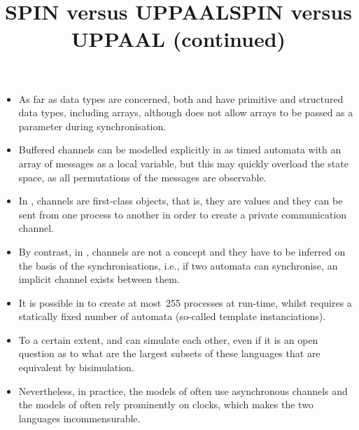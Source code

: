 \documentclass[wide]{slides}
\begin{document}
\begin{slide}
  \title{SPIN versus UPPAAL}

  \begin{itemize}

    \item As far as data types are concerned, both \Promela and
      \UPPAAL have primitive and structured data types, including
      arrays, although \Promela does not allow arrays to be passed as
      a parameter during synchronisation.

    \item Buffered channels can be modelled explicitly in \UPPAAL as
      timed automata with an array of messages as a local variable,
      but this may quickly overload the state space, as all
      permutations of the messages are observable.

    \item In \Promela, channels are first\hyp{}class objects, that is,
      they are values and they can be sent from one process to another
      in order to create a private communication channel.

    \item By contrast, in \UPPAAL, channels are not a concept and they
      have to be inferred on the basis of the synchronisations, i.e.,
      if two automata can synchronise, an implicit channel exists
      between them.

  \end{itemize}
\end{slide}

\begin{slide}
  \title{SPIN versus UPPAAL (continued)}

  \begin{itemize}

    \item It is possible in \Promela to create at most~255 processes
      at run\hyp{}time, whilst \UPPAAL requires a statically fixed
      number of automata (so\hyp{}called template instanciations).

    \item To a certain extent, \Promela and \UPPAAL can simulate each
      other, even if it is an open question as to what are the largest
      subsets of these languages that are equivalent by bisimulation.

    \item Nevertheless, in practice, the models of \Promela often use
      asynchronous channels and the models of \UPPAAL often rely
      prominently on clocks, which makes the two languages
      incommensurable.

  \end{itemize}
\end{slide}
\end{document}
